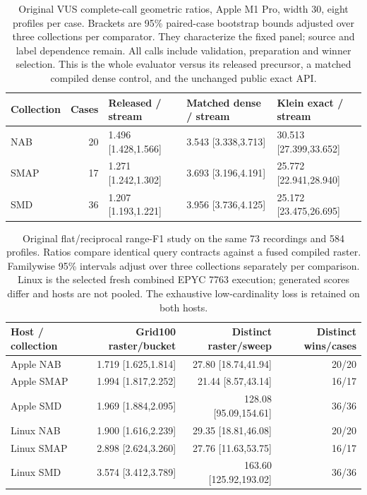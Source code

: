 \begin{table}[t]\centering\small
\begin{tabular}{lrlll}\toprule
Collection & Cases & Released / stream & Matched dense / stream & Klein exact / stream\\\midrule
NAB & 20 & 1.496 [1.428,1.566] & 3.543 [3.338,3.713] & 30.513 [27.399,33.652]\\
SMAP & 17 & 1.271 [1.242,1.302] & 3.693 [3.196,4.191] & 25.772 [22.941,28.940]\\
SMD & 36 & 1.207 [1.193,1.221] & 3.956 [3.736,4.125] & 25.172 [23.475,26.695]\\
\bottomrule\end{tabular}
\caption{Original VUS complete-call geometric ratios, Apple M1 Pro, width 30,
eight profiles per case. Brackets are 95\% paired-case bootstrap bounds adjusted
over three collections per comparator. They characterize the fixed panel;
source and label dependence remain. All calls include validation, preparation
and winner selection. This is the whole evaluator versus its released
precursor, a matched compiled dense control, and the unchanged public exact API.}
\label{tab:vus-main}\end{table}

\begin{table}[t]\centering\small
\begin{tabular}{lrrr}\toprule
Host / collection & Grid100 raster/bucket & Distinct raster/sweep & Distinct wins/cases\\\midrule
Apple NAB & 1.719 [1.625,1.814] & 27.80 [18.74,41.94] & 20/20\\
Apple SMAP & 1.994 [1.817,2.252] & 21.44 [8.57,43.14] & 16/17\\
Apple SMD & 1.969 [1.884,2.095] & 128.08 [95.09,154.61] & 36/36\\\midrule
Linux NAB & 1.900 [1.616,2.239] & 29.35 [18.81,46.08] & 20/20\\
Linux SMAP & 2.898 [2.624,3.260] & 27.76 [11.63,53.75] & 16/17\\
Linux SMD & 3.574 [3.412,3.789] & 163.60 [125.92,193.02] & 36/36\\
\bottomrule\end{tabular}
\caption{Original flat/reciprocal range-F1 study on the same 73 recordings and
584 profiles. Ratios compare identical query contracts against a fused compiled
raster. Familywise 95\% intervals adjust over three collections separately per
comparison. Linux is the selected fresh combined EPYC 7763 execution; generated
scores differ and hosts are not pooled. The exhaustive low-cardinality loss is
retained on both hosts.}
\label{tab:range-main}\end{table}
